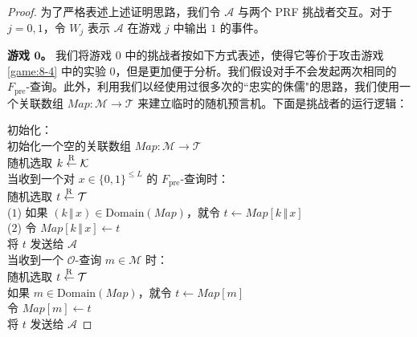 \begin{proof}
为了严格表述上述证明思路，我们令 $\mathcal{A}$ 与两个 PRF 挑战者交互。对于 $j=0,1$，令 $W_j$ 表示 $\mathcal{A}$ 在游戏 $j$ 中输出 $1$ 的事件。

\vspace{5pt}

\noindent\textbf{游戏 $\mathbf{0}$。}
我们将游戏 $0$ 中的挑战者按如下方式表述，使得它等价于攻击游戏 \ref{game:8-4} 中的实验 $0$，但是更加便于分析。我们假设对手不会发起两次相同的 $F_\mathrm{pre}$-查询。此外，利用我们以经使用过很多次的``忠实的侏儒"的思路，我们使用一个关联数组 $Map:\mathcal{M}\to\mathcal{T}$ 来建立临时的随机预言机。下面是挑战者的运行逻辑：

\vspace{5pt}

\hspace*{5pt} 初始化：\\
\hspace*{50pt} 初始化一个空的关联数组 $Map:\mathcal{M}\to\mathcal{T}$\\
\hspace*{50pt} 随机选取 $k\overset{\rm R}\leftarrow\mathcal{K}$\\
\hspace*{26pt} 当收到一个对 $x\in\{0,1\}^{\leq L}$ 的 $F_\mathrm{pre}$-查询时：\\
\hspace*{50pt} 随机选取 $t\overset{\rm R}\leftarrow\mathcal{T}$\\
\hspace*{5pt} ($1$)
\hspace*{24.5pt} 如果 $(k\,\Vert\,x)\in\mathrm{Domain}(Map)$，就令 $t\leftarrow Map[k\,\Vert\,x]$\\
\hspace*{5pt} ($2$)
\hspace*{24.5pt} 令 $Map[k\,\Vert\,x]\leftarrow t$\\
\hspace*{50pt} 将 $t$ 发送给 $\mathcal{A}$\\
\hspace*{26pt} 当收到一个 $\mathcal{O}$-查询 $m\in\mathcal{M}$ 时：\\
\hspace*{50pt} 随机选取 $t\overset{\rm R}\leftarrow\mathcal{T}$\\
\hspace*{50pt} 如果 $m\in\mathrm{Domain}(Map)$，就令 $t\leftarrow Map[m]$\\
\hspace*{50pt} 令 $Map[m]\leftarrow t$\\
\hspace*{50pt} 将 $t$ 发送给 $\mathcal{A}$


\end{proof}
